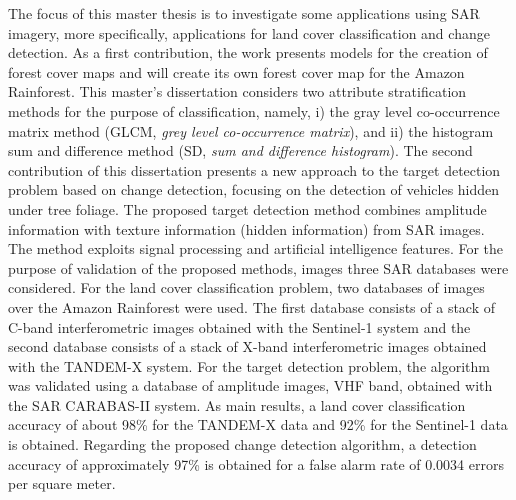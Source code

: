 The focus of this master thesis is to investigate some applications using SAR imagery, more specifically, applications for land cover classification and change detection.
As a first contribution, the work presents models for the creation of forest cover maps and will create its own forest cover map for the Amazon Rainforest. This master's dissertation considers two attribute stratification methods for the purpose of classification, namely, i) the gray level co-occurrence matrix method (GLCM, \textit{grey level co-occurrence matrix}), and ii) the histogram sum and difference method (SD, \textit{sum and difference histogram}).
The second contribution of this dissertation presents a new approach to the target detection problem based on change detection, focusing on the detection of vehicles hidden under tree foliage. The proposed target detection method combines amplitude information with texture information (hidden information) from SAR images. The method exploits signal processing and artificial intelligence features.  For the purpose of validation of the proposed methods, images three SAR databases were considered. For the land cover classification problem, two databases of images over the Amazon Rainforest were used. The first database consists of a stack of C-band interferometric images obtained with the Sentinel-1 system and the second database consists of a stack of X-band interferometric images obtained with the TANDEM-X system. For the target detection problem, the algorithm was validated using a database of amplitude images, VHF band, obtained with the SAR CARABAS-II system. As main results, a land cover classification accuracy of about 98\% for the TANDEM-X data and 92\% for the Sentinel-1 data is obtained. Regarding the proposed change detection algorithm, a detection accuracy of approximately 97\% is obtained for a false alarm rate of 0.0034 errors per square meter.